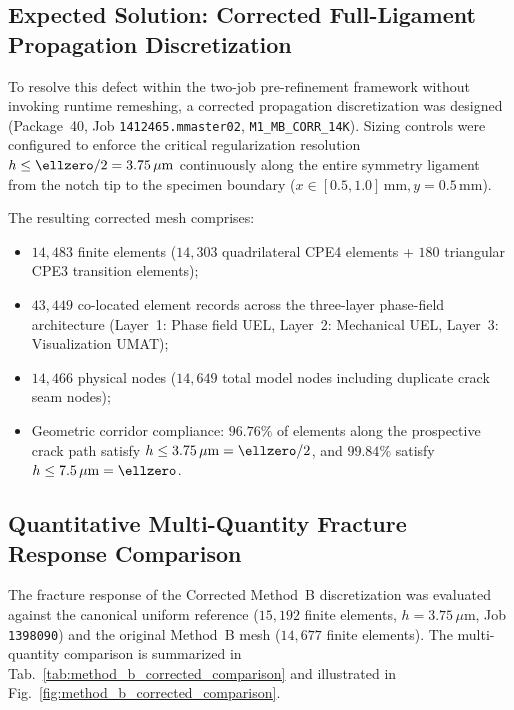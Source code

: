 \subsection{Expected Solution: Corrected Full-Ligament Propagation Discretization}
\label{subsec:method_b_corrected_solution}

To resolve this defect within the two-job pre-refinement framework without invoking runtime remeshing, a corrected propagation discretization was designed (Package~40, Job \texttt{1412465.mmaster02}, \texttt{M1\_MB\_CORR\_14K}). Sizing controls were configured to enforce the critical regularization resolution $h \le \ellzero / 2 = 3.75\,\mu\mathrm{m}$ continuously along the entire symmetry ligament from the notch tip to the specimen boundary ($x \in [0.5, 1.0]\,\mathrm{mm}, y = 0.5\,\mathrm{mm}$).

The resulting corrected mesh comprises:
\begin{itemize}
  \item $14{,}483$ finite elements ($14{,}303$ quadrilateral CPE4 elements + $180$ triangular CPE3 transition elements);
  \item $43{,}449$ co-located element records across the three-layer phase-field architecture (Layer~1: Phase field UEL, Layer~2: Mechanical UEL, Layer~3: Visualization UMAT);
  \item $14{,}466$ physical nodes ($14{,}649$ total model nodes including duplicate crack seam nodes);
  \item Geometric corridor compliance: $96.76\%$ of elements along the prospective crack path satisfy $h \le 3.75\,\mu\mathrm{m} = \ellzero / 2$, and $99.84\%$ satisfy $h \le 7.5\,\mu\mathrm{m} = \ellzero$.
\end{itemize}

\subsection{Quantitative Multi-Quantity Fracture Response Comparison}
\label{subsec:method_b_corrected_quantitative}

The fracture response of the Corrected Method~B discretization was evaluated against the canonical uniform reference ($15{,}192$ finite elements, $h = 3.75\,\mu\mathrm{m}$, Job \texttt{1398090}) and the original Method~B mesh ($14{,}677$ finite elements). The multi-quantity comparison is summarized in Tab.~\ref{tab:method_b_corrected_comparison} and illustrated in Fig.~\ref{fig:method_b_corrected_comparison}.

